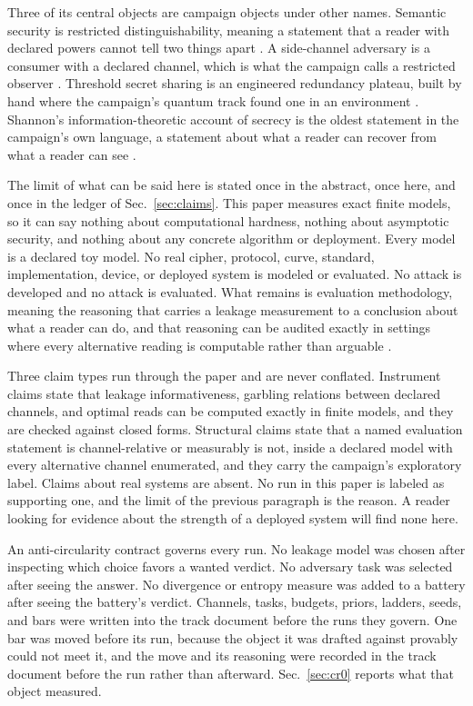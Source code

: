 \documentclass[aps,pre,reprint,nofootinbib]{revtex4-2}
\begin{document}
Three of its central objects are campaign objects under other names.
Semantic security is restricted distinguishability, meaning a
statement that a reader with declared powers cannot tell two things
apart \cite{GoldwasserMicali1984}.  A side-channel adversary is a
consumer with a declared channel, which is what the campaign calls a
restricted observer \cite{Kocher1999}.  Threshold secret sharing is an
engineered redundancy plateau, built by hand where the campaign's
quantum track found one in an environment \cite{Shamir1979,
Gen2Paper}.  Shannon's information-theoretic account of secrecy is the
oldest statement in the campaign's own language, a statement about
what a reader can recover from what a reader can see
\cite{Shannon1949}.

The limit of what can be said here is stated once in the abstract,
once here, and once in the ledger of
Sec.~\ref{sec:claims}.  This paper measures exact finite models, so it
can say nothing about computational hardness, nothing about asymptotic
security, and nothing about any concrete algorithm or deployment.
Every model is a declared toy model.  No real cipher, protocol, curve,
standard, implementation, device, or deployed system is modeled or
evaluated.  No attack is developed and no attack is evaluated.  What
remains is
evaluation methodology, meaning the reasoning that carries a leakage
measurement to a conclusion about what a reader can do, and that
reasoning can be audited exactly in settings where every alternative
reading is computable rather than arguable \cite{Standaert2009}.

Three claim types run through the paper and are never conflated.
Instrument claims state that leakage informativeness, garbling
relations between declared channels, and optimal reads can be computed
exactly in finite models, and they are checked against closed forms.
Structural claims state that a named evaluation statement is
channel-relative or measurably is not, inside a declared model with
every alternative channel enumerated, and they carry the campaign's
exploratory label.  Claims about real systems are absent.  No run in
this paper is labeled as supporting one, and the limit of the previous
paragraph is the reason.  A reader looking for evidence about the
strength of a deployed system will find none here.

An anti-circularity contract governs every run.  No leakage model was
chosen after inspecting which choice favors a wanted verdict.  No
adversary task was selected after seeing the answer.  No divergence or
entropy measure was added to a battery after seeing the battery's
verdict.  Channels, tasks, budgets, priors, ladders, seeds, and bars
were written into the track document before the runs they govern.  One
bar was moved before its run, because the object it was drafted
against provably could not meet it, and the move and its reasoning
were recorded in the track document before the run rather than
afterward.  Sec.~\ref{sec:cr0} reports what that object measured.
\end{document}
